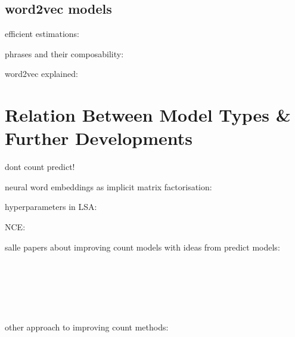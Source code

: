 \subsection{word2vec models}
efficient estimations:~\cite{mikolov13_effic_estim_word_repres_vector_space}

phrases and their composability:~\cite{mikolov13_distr_repres_words_phras_their_compos}

word2vec explained:~\cite{goldberg14_word2_explain}


\section{Relation Between Model Types \& Further Developments}
dont count predict!~\cite{baroni-etal-2014-dont}

neural word embeddings as implicit matrix factorisation:~\cite{levy-2014-neural-WE-as}

hyperparameters in LSA:~\cite{levy-2015-improving-distributional-similarity}

NCE:~\cite{mnih-2013-NCE}


salle papers about improving count models with ideas from predict models:

~\cite{salle16_enhan_lexvec_distr_word_repres}

~\cite{salle-etal-2016-matrix}

~\cite{salle-2018-incorporating}

other approach to improving count methods:~\cite{stratos-2015-model-based-word}


